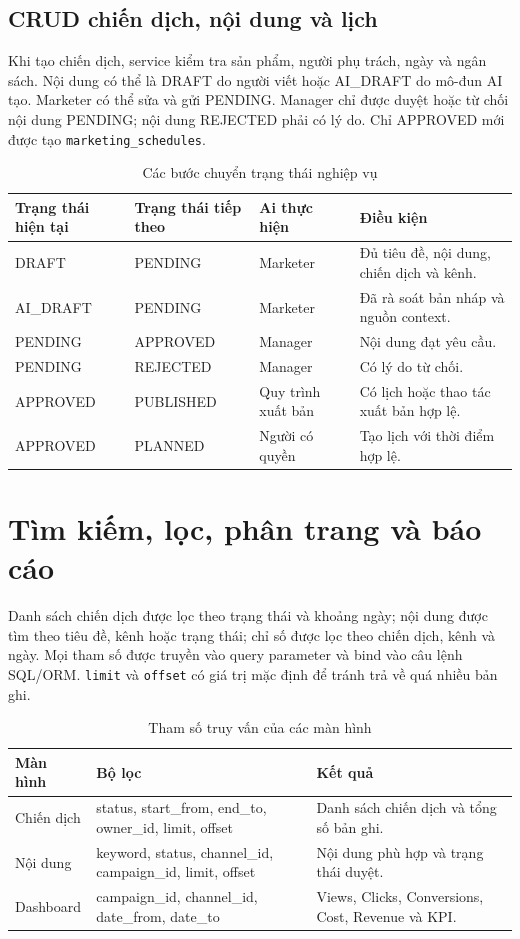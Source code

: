 \subsection{CRUD chiến dịch, nội dung và lịch}

Khi tạo chiến dịch, service kiểm tra sản phẩm, người phụ trách, ngày và ngân sách. Nội dung có thể là DRAFT do người viết hoặc AI\_DRAFT do mô-đun AI tạo. Marketer có thể sửa và gửi PENDING. Manager chỉ được duyệt hoặc từ chối nội dung PENDING; nội dung REJECTED phải có lý do. Chỉ APPROVED mới được tạo \texttt{marketing\_schedules}.

\begin{table}[h!]
\centering
\small
\caption{Các bước chuyển trạng thái nghiệp vụ}
\begin{tabularx}{\textwidth}{|C{2.0cm}|C{2.2cm}|Y|Y|}
\hline
\textbf{Trạng thái hiện tại} & \textbf{Trạng thái tiếp theo} & \textbf{Ai thực hiện} & \textbf{Điều kiện}\\\hline
DRAFT & PENDING & Marketer & Đủ tiêu đề, nội dung, chiến dịch và kênh.\\\hline
AI\_DRAFT & PENDING & Marketer & Đã rà soát bản nháp và nguồn context.\\\hline
PENDING & APPROVED & Manager & Nội dung đạt yêu cầu.\\\hline
PENDING & REJECTED & Manager & Có lý do từ chối.\\\hline
APPROVED & PUBLISHED & Quy trình xuất bản & Có lịch hoặc thao tác xuất bản hợp lệ.\\\hline
APPROVED & PLANNED & Người có quyền & Tạo lịch với thời điểm hợp lệ.\\\hline
\end{tabularx}
\end{table}

\section{Tìm kiếm, lọc, phân trang và báo cáo}

Danh sách chiến dịch được lọc theo trạng thái và khoảng ngày; nội dung được tìm theo tiêu đề, kênh hoặc trạng thái; chỉ số được lọc theo chiến dịch, kênh và ngày. Mọi tham số được truyền vào query parameter và bind vào câu lệnh SQL/ORM. \texttt{limit} và \texttt{offset} có giá trị mặc định để tránh trả về quá nhiều bản ghi.

\begin{table}[h!]
\centering
\small
\caption{Tham số truy vấn của các màn hình}
\begin{tabularx}{\textwidth}{|L{3.0cm}|Y|Y|}
\hline
\textbf{Màn hình} & \textbf{Bộ lọc} & \textbf{Kết quả}\\\hline
Chiến dịch & status, start\_from, end\_to, owner\_id, limit, offset & Danh sách chiến dịch và tổng số bản ghi.\\\hline
Nội dung & keyword, status, channel\_id, campaign\_id, limit, offset & Nội dung phù hợp và trạng thái duyệt.\\\hline
Dashboard & campaign\_id, channel\_id, date\_from, date\_to & Views, Clicks, Conversions, Cost, Revenue và KPI.\\\hline
\end{tabularx}
\end{table}

